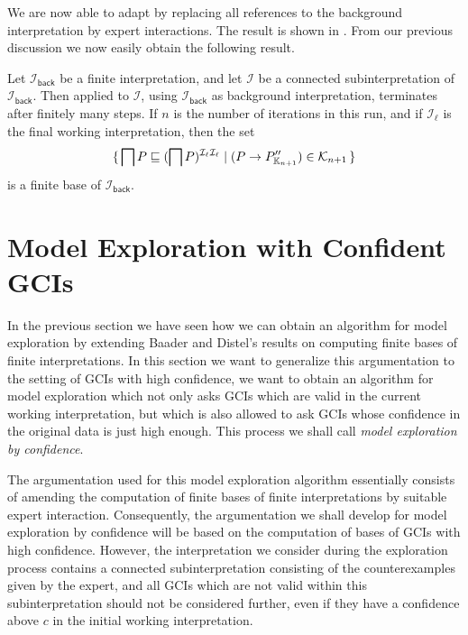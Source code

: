 We are now able to adapt  by replacing all references to
the background interpretation by expert interactions.  The result is shown in
.  From our previous discussion we now easily obtain the
following result.

\begin{Theorem}
  \label{thm:Felix-6.16}
  Let $\mathcal{I}_{\mathsf{back}}$ be a finite interpretation, and let $\mathcal{I}$ be a
  connected subinterpretation of $\mathcal{I}_{\mathsf{back}}$.  Then
   applied to $\mathcal{I}$, using
  $\mathcal{I}_{\mathsf{back}}$ as background interpretation, terminates after finitely
  many steps.  If $n$ is the number of iterations in this run, and if $\mathcal{I}_{\ell}$
  is the final working interpretation, then the set
  \begin{equation*}
    {\ensuremath{\{\, \bigsqcap P \sqsubseteq (\bigsqcap P)^{\mathcal{I}_{\ell}\mathcal{I}_{\ell}}
      \mid (P \to P_{{\mathbb{K}}_{n+1}}'') \in \mathcal{K}_{n+1} \,\}}}
  \end{equation*}
  is a finite base of $\mathcal{I}_{\mathsf{back}}$.
\end{Theorem}

\section{Model Exploration with Confident GCIs}
\label{sec:model-expl-with-1}

In the previous section we have seen how we can obtain an algorithm for model exploration
by extending Baader and Distel's results on computing finite bases of finite
interpretations.  In this section we want to generalize this argumentation to the setting
of GCIs with high confidence, \ie we want to obtain an algorithm for model exploration
which not only asks GCIs which are valid in the current working interpretation, but which
is also allowed to ask GCIs whose confidence in the original data is just high enough.
This process we shall call \emph{model exploration by confidence}.

The argumentation used for this model exploration algorithm essentially consists of
amending the computation of finite bases of finite interpretations by suitable expert
interaction.  Consequently, the argumentation we shall develop for model exploration by
confidence will be based on the computation of bases of GCIs with high confidence.
However, the interpretation we consider during the exploration process contains a
connected subinterpretation consisting of the counterexamples given by the expert, and all
GCIs which are not valid within this subinterpretation should not be considered further,
even if they have a confidence above $c$ in the initial working interpretation.

